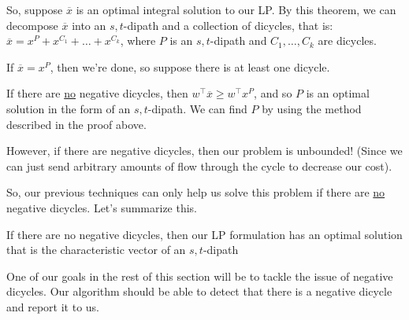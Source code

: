 So, suppose $\overline{x}$ is an optimal integral solution to our LP.
By this theorem, we can decompose $\overline{x}$ into an $s,t$-dipath and a collection of dicycles, that is: $\overline{x} = x^P + x^{C_1} + \ldots + x^{C_k}$, where $P$ is an $s,t$-dipath and $C_1, \ldots, C_k$ are dicycles.

If $\overline{x} = x^P$, then we're done, so suppose there is at least one dicycle.

If there are \underline{no} negative dicycles, then $w^\intercal \overline{x} \geq w^\intercal x^P$, and so $P$ is an optimal solution in the form of an $s,t$-dipath.
We can find $P$ by using the method described in the proof above.

However, if there are negative dicycles, then our problem is unbounded! (Since we can just send arbitrary amounts of flow through the cycle to decrease our cost).

So, our previous techniques can only help us solve this problem if there are \underline{no} negative dicycles. Let's summarize this.

\begin{theorem}{}{}
    If there are no negative dicycles, then our LP formulation has an optimal solution that is the characteristic vector of an $s,t$-dipath
\end{theorem}

One of our goals in the rest of this section will be to tackle the issue of negative dicycles. Our algorithm should be able to detect that there is a negative dicycle and report it to us.